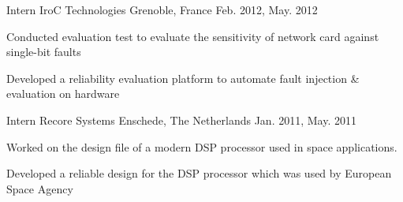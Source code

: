 \begin{cventries}
  \cventry
    {Intern} %
    {IroC Technologies} %
    {Grenoble, France} %
    {Feb. 2012, May. 2012} %
    {
      \begin{cvitems} %
        \item {Conducted evaluation test to evaluate the sensitivity of network card against single-bit faults}
        \item {Developed a reliability evaluation platform to automate fault injection \&  evaluation on hardware}
	\end{cvitems}
	}

  \cventry
    {Intern} %
    {Recore Systems} %
    {Enschede, The Netherlands} %
    {Jan. 2011, May. 2011} %
    {
      \begin{cvitems} %
        \item {Worked on the design file of a modern DSP processor used in space applications.}
        \item {Developed a reliable design for the DSP processor which was used by European Space Agency}
      \end{cvitems}
    }

\end{cventries}
